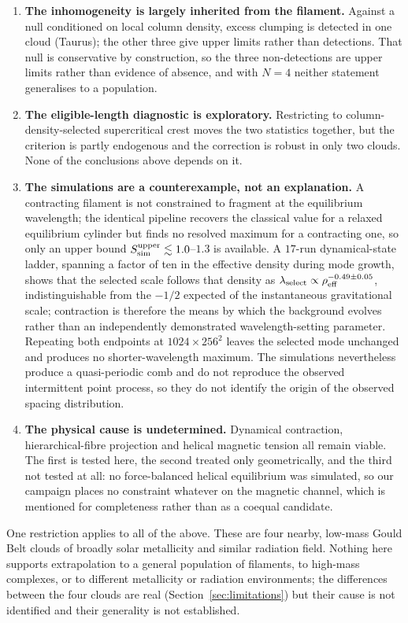 \documentclass[usenatbib,twoside,twocolumn]{mnras}
\begin{document}
\begin{enumerate}
\item \textbf{The inhomogeneity is largely inherited from the filament.} Against a null conditioned on local column density, excess clumping is detected in one cloud (Taurus); the other three give upper limits rather than detections. That null is conservative by construction, so the three non-detections are upper limits rather than evidence of absence, and with $N=4$ neither statement generalises to a population.
\item \textbf{The eligible-length diagnostic is exploratory.} Restricting to column-density-selected supercritical crest moves the two statistics together, but the criterion is partly endogenous and the correction is robust in only two clouds. None of the conclusions above depends on it.
\item \textbf{The simulations are a counterexample, not an explanation.} A contracting filament is not constrained to fragment at the equilibrium wavelength; the identical pipeline recovers the classical value for a relaxed equilibrium cylinder but finds no resolved maximum for a contracting one, so only an upper bound $S_{\rm sim}^{\rm upper}\lesssim1.0$--$1.3$ is available. A $17$-run dynamical-state ladder, spanning a factor of ten in the effective density during mode growth, shows that the selected scale follows that density as $\lambda_{\rm select}\propto\rho_{\rm eff}^{-0.49\pm0.05}$, indistinguishable from the $-1/2$ expected of the instantaneous gravitational scale; contraction is therefore the means by which the background evolves rather than an independently demonstrated wavelength-setting parameter. Repeating both endpoints at $1024\times256^2$ leaves the selected mode unchanged and produces no shorter-wavelength maximum. The simulations nevertheless produce a quasi-periodic comb and do not reproduce the observed intermittent point process, so they do not identify the origin of the observed spacing distribution.
\item \textbf{The physical cause is undetermined.} Dynamical contraction, hierarchical-fibre projection and helical magnetic tension all remain viable. The first is tested here, the second treated only geometrically, and the third not tested at all: no force-balanced helical equilibrium was simulated, so our campaign places no constraint whatever on the magnetic channel, which is mentioned for completeness rather than as a coequal candidate.
\end{enumerate}

One restriction applies to all of the above. These are four nearby, low-mass Gould Belt clouds of broadly solar metallicity and similar radiation field. Nothing here supports extrapolation to a general population of filaments, to high-mass complexes, or to different metallicity or radiation environments; the differences between the four clouds are real (Section~\ref{sec:limitations}) but their cause is not identified and their generality is not established.
\end{document}

